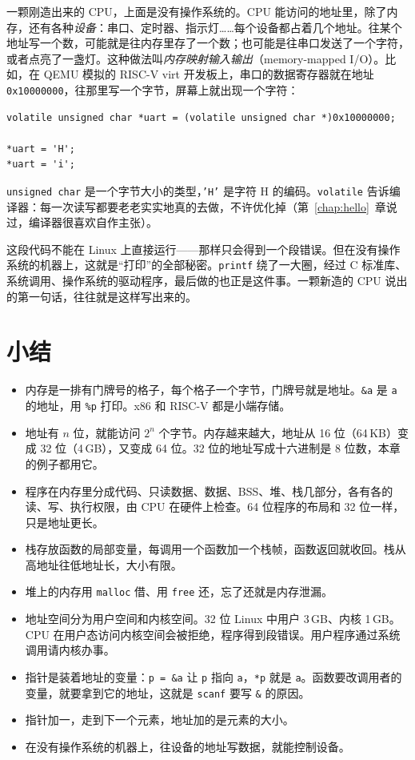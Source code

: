 一颗刚造出来的 CPU，上面是没有操作系统的。CPU 能访问的地址里，除了内存，还有各种\emph{设备}：串口、定时器、指示灯……每个设备都占着几个地址。往某个地址写一个数，可能就是往内存里存了一个数；也可能是往串口发送了一个字符，或者点亮了一盏灯。这种做法叫\emph{内存映射输入输出}（memory-mapped I/O）。比如，在 QEMU 模拟的 RISC-V virt 开发板上，串口的数据寄存器就在地址 \texttt{0x10000000}，往那里写一个字节，屏幕上就出现一个字符：
\begin{verbatim}
volatile unsigned char *uart = (volatile unsigned char *)0x10000000;

*uart = 'H';
*uart = 'i';
\end{verbatim}

\texttt{unsigned char} 是一个字节大小的类型，\texttt{'H'} 是字符 H 的编码。\texttt{volatile} 告诉编译器：每一次读写都要老老实实地真的去做，不许优化掉（第~\ref{chap:hello}~章说过，编译器很喜欢自作主张）。

这段代码不能在 Linux 上直接运行——那样只会得到一个段错误。但在没有操作系统的机器上，这就是“打印”的全部秘密。\texttt{printf} 绕了一大圈，经过 C 标准库、系统调用、操作系统的驱动程序，最后做的也正是这件事。一颗新造的 CPU 说出的第一句话，往往就是这样写出来的。

\section{小结}

\begin{itemize}
  \item 内存是一排有门牌号的格子，每个格子一个字节，门牌号就是地址。\texttt{\&a} 是 \texttt{a} 的地址，用 \texttt{\%p} 打印。x86 和 RISC-V 都是小端存储。
  \item 地址有 $n$ 位，就能访问 $2^n$ 个字节。内存越来越大，地址从 16 位（64\,KB）变成 32 位（4\,GB），又变成 64 位。32 位的地址写成十六进制是 8 位数，本章的例子都用它。
  \item 程序在内存里分成代码、只读数据、数据、BSS、堆、栈几部分，各有各的读、写、执行权限，由 CPU 在硬件上检查。64 位程序的布局和 32 位一样，只是地址更长。
  \item 栈存放函数的局部变量，每调用一个函数加一个栈帧，函数返回就收回。栈从高地址往低地址长，大小有限。
  \item 堆上的内存用 \texttt{malloc} 借、用 \texttt{free} 还，忘了还就是内存泄漏。
  \item 地址空间分为用户空间和内核空间。32 位 Linux 中用户 3\,GB、内核 1\,GB。CPU 在用户态访问内核空间会被拒绝，程序得到段错误。用户程序通过系统调用请内核办事。
  \item 指针是装着地址的变量：\texttt{p = \&a} 让 \texttt{p} 指向 \texttt{a}，\texttt{*p} 就是 \texttt{a}。函数要改调用者的变量，就要拿到它的地址，这就是 \texttt{scanf} 要写 \texttt{\&} 的原因。
  \item 指针加一，走到下一个元素，地址加的是元素的大小。
  \item 在没有操作系统的机器上，往设备的地址写数据，就能控制设备。
\end{itemize}

